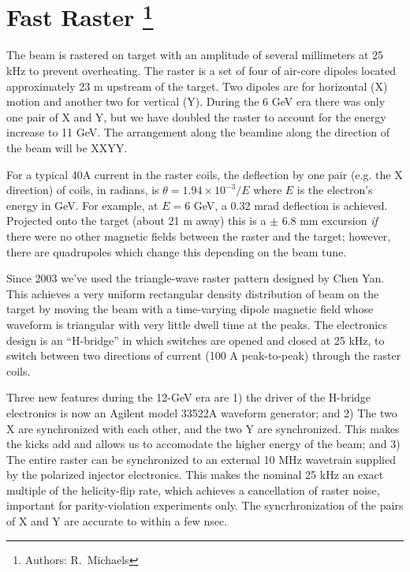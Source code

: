 \section[Fast Raster]{Fast Raster
\footnote{Authors: R.~Michaels }
}


The beam is rastered on target with an amplitude of
several millimeters at 25 kHz to prevent overheating.  
The raster is a set of four of air-core dipoles located
approximately 23 m upstream of the target. 
Two dipoles are for horizontal (X) motion and
another two for vertical (Y).  During the 6 GeV era
there was only one pair of X and Y, but we have doubled
the raster to account for the energy increase to 11 GeV.
The arrangement along the beamline along the 
direction of the beam will be XXYY.

For a typical 40A current in the raster coils, the
deflection by one pair (e.g. the X direction) of coils, 
in radians, is $\theta = 1.94 \times 10^{-3}/ E$
where $E$ is the electron's energy in GeV.
For example, at $E = 6$ GeV, a 0.32 mrad deflection is achieved.
Projected onto the target (about 21 m away) this is a $\pm$ 6.8 mm
excursion {\it if} there were no other magnetic fields 
between the raster and the target; however, there are quadrupoles
which change this depending on the beam tune.

Since 2003 we've used the triangle-wave 
raster pattern designed by Chen Yan.  
This achieves a very uniform rectangular
density distribution of beam on the target 
by moving the beam with a time-varying dipole
magnetic field whose waveform is triangular
with very little dwell time at the peaks.  
The electronics design is an ``H-bridge''
in which switches are opened and closed 
at 25 kHz, to switch between two directions 
of current (100 A peak-to-peak) 
through the raster coils.

Three new features during the 12-GeV era are 
1) the driver of the H-bridge electronics is now
an Agilent model 33522A waveform generator; and
2) The two X are synchronized with each other, and
the two Y are synchronized.  This makes the kicks
add and allows us to accomodate the higher energy
of the beam; and 3) The entire raster can
be synchronized to an external 10 MHz wavetrain
supplied by the polarized injector electronics.
This makes the nominal 25 kHz an exact multiple of
the helicity-flip rate, which achieves a cancellation
of raster noise, important for parity-violation 
experiments only.
The syncrhronization of the pairs of X and Y are
accurate to within a few nsec.

